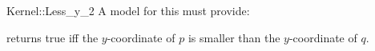 \begin{ccRefFunctionObjectConcept}{Kernel::Less_y_2}
A model for this must provide:


{returns true iff the $y$-coordinate of $p$ is smaller than the
$y$-coordinate of $q$.}

\ccIsModel{}

\end{ccRefFunctionObjectConcept}
